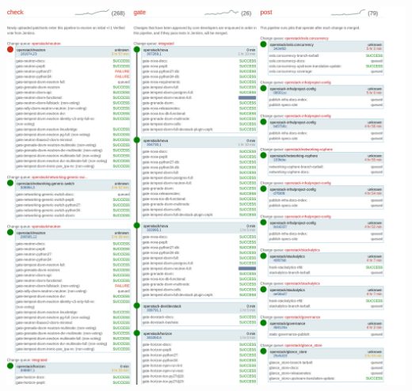 \documentclass[aspectratio=169,11pt,hyperref={colorlinks=true}]{beamer}
\begin{document}
\begin{frame}
\begin{center}
    \includegraphics[width=.8\textwidth]{ZuulStatus.png}
\end{center}
\end{frame}
\end{document}
